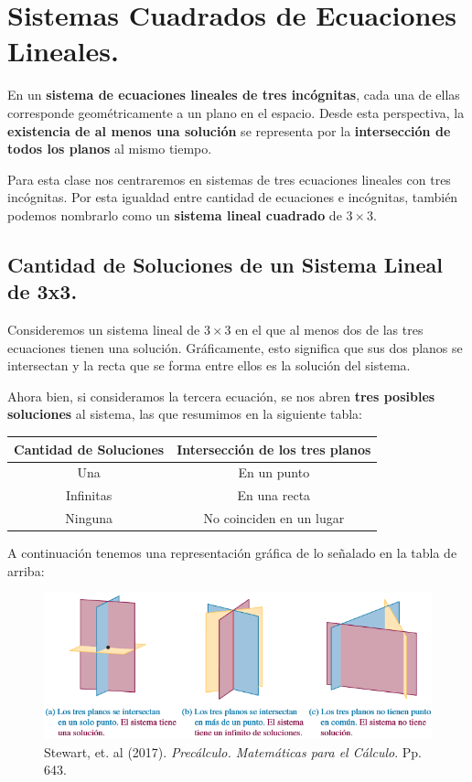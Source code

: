 \documentclass[12pt]{article}
\begin{document}
\section{Sistemas Cuadrados de Ecuaciones Lineales.}

En un \textbf{sistema de ecuaciones lineales de tres incógnitas}, cada una de ellas corresponde geométricamente a un plano en el espacio. Desde esta perspectiva, la \textbf{existencia de al menos una solución} se representa por la \textbf{intersección de todos los planos} al mismo tiempo.

Para esta clase nos centraremos en sistemas de tres ecuaciones lineales con tres incógnitas. Por esta igualdad entre cantidad de ecuaciones e incógnitas, también podemos nombrarlo como un \textbf{sistema lineal cuadrado} de $3 \times 3$.

\subsection{Cantidad de Soluciones de un Sistema Lineal de 3x3.}

Consideremos un sistema lineal de $3 \times 3$ en el que al menos dos de las tres ecuaciones tienen una solución. Gráficamente, esto significa que sus dos planos se intersectan y la recta que se forma entre ellos es la solución del sistema.

Ahora bien, si consideramos la tercera ecuación, se nos abren \textbf{tres posibles soluciones} al sistema, las que resumimos en la siguiente tabla:

\begin{table}[hbt!]
\centering

\begin{tabular}{c c}
\hline
Cantidad de Soluciones & Intersección de los tres planos \\
\hline
Una & En un punto \\
Infinitas & En una recta \\
Ninguna & No coinciden en un lugar \\
\hline
\end{tabular}

\end{table}

A continuación tenemos una representación gráfica de lo señalado en la tabla de arriba:

\begin{figure}[hbt!]
\centering
\includegraphics[scale=0.65]{img/number_of_solutions.png}
\caption{Stewart, et. al (2017). \textit{Precálculo. Matemáticas para el Cálculo}. Pp. 643.}
\end{figure}
\end{document}
